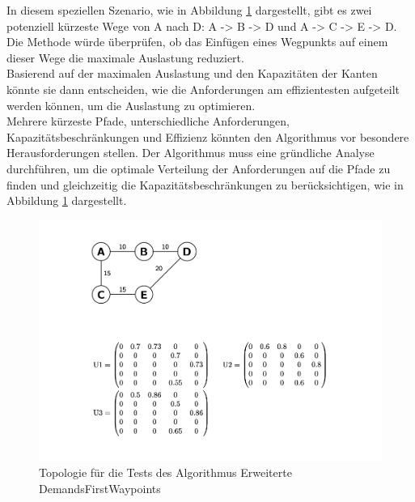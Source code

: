 \documentclass[sigconf, nonacm, review]{acmart}
\begin{document}
In diesem speziellen Szenario, wie in Abbildung \ref{fig5} dargestellt, gibt es zwei potenziell kürzeste Wege von A nach D: A -> B -> D und A -> C -> E -> D. Die Methode würde überprüfen, ob das Einfügen eines Wegpunkts auf einem dieser Wege die maximale Auslastung reduziert.\\
Basierend auf der maximalen Auslastung und den Kapazitäten der Kanten könnte sie dann entscheiden, wie die Anforderungen am effizientesten aufgeteilt werden können, um die Auslastung zu optimieren.\\
Mehrere kürzeste Pfade, unterschiedliche Anforderungen, Kapazitätsbeschränkungen und Effizienz könnten den Algorithmus vor besondere Herausforderungen stellen. Der Algorithmus muss eine gründliche Analyse durchführen, um die optimale Verteilung der Anforderungen auf die Pfade zu finden und gleichzeitig die Kapazitätsbeschränkungen zu berücksichtigen, wie in Abbildung \ref{fig5} dargestellt.

\begin{figure}
\centering
\includegraphics[width=\linewidth]{figures/1.png}
\caption{Topologie für die Tests des Algorithmus Erweiterte DemandsFirstWaypoints }
\label{fig5}
\end{figure}
\end{document}
